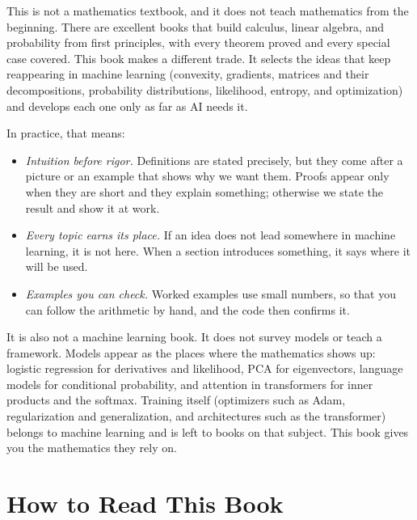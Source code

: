 This is not a mathematics textbook, and it does not teach mathematics
from the beginning. There are excellent books that build calculus,
linear algebra, and probability from first principles, with every
theorem proved and every special case covered. This book makes a
different trade. It selects the ideas that keep reappearing in machine
learning (convexity, gradients, matrices and their decompositions,
probability distributions, likelihood, entropy, and optimization) and
develops each one only as far as AI needs it.

In practice, that means:
\begin{itemize}
  \item \emph{Intuition before rigor.} Definitions are stated precisely,
    but they come after a picture or an example that shows why we
    want them. Proofs appear only when they are short and they explain
    something; otherwise we state the result and show it at work.
  \item \emph{Every topic earns its place.} If an idea does not lead
    somewhere in machine learning, it is not here. When a section
    introduces something, it says where it will be used.
  \item \emph{Examples you can check.} Worked examples use small numbers,
    so that you can follow the arithmetic by hand, and the code then
    confirms it.
\end{itemize}
It is also not a machine learning book. It does not survey models or
teach a framework. Models appear as the places where the mathematics
shows up: logistic regression for derivatives and likelihood, PCA for
eigenvectors, language models for conditional probability, and
attention in transformers for inner products and the softmax. Training
itself (optimizers such as Adam, regularization and generalization,
and architectures such as the transformer) belongs to machine learning
and is left to books on that subject. This book gives you the
mathematics they rely on.

\section*{How to Read This Book}

